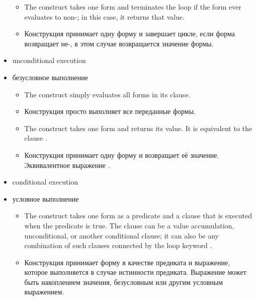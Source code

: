 \begin{itemize}
\begin{itemize}
  \item The  construct takes one form and terminates the
    loop if the form ever evaluates to non-; in this case, it
    returns that value.

  \item Конструкция  принимает одну форму и завершает
    цикле, если форма возвращает не-, в этом случае
    возвращается значение формы.
  \end{itemize}

  \item unconditional execution

  \item безусловное выполнение

  \begin{itemize}
  \item The  construct simply evaluates all forms in its
clause.

  \item Конструкция  просто выполняет все переданные формы.

  \item The  construct takes one form and returns its
    value.  It is equivalent to the clause .

  \item Конструкция  принимает одну форму и возвращает её
    значение.  Эквивалентное выражение .
  \end{itemize}

  \item conditional execution

  \item условное выполнение

  \begin{itemize}
  \item The  construct takes one form as a predicate and a
    clause that is executed when the predicate is true. The clause can
    be a value accumulation, unconditional, or another conditional
    clause; it can also be any combination of such clauses connected
    by the loop keyword .

  \item Конструкция  принимает форму в качестве предиката и
    выражение, которое выполняется в случае истинности
    предиката. Выражение может быть накоплением значения, безусловным
    или другим условным выражением.


\end{itemize}
\end{itemize}
